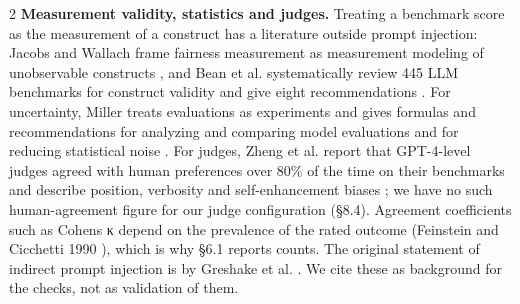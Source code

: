 \documentclass[9pt]{extarticle}
\begin{document}
\begin{multicols}{2}
\textbf{Measurement validity, statistics and judges.} Treating a benchmark score as the measurement of a construct has a literature outside prompt injection: Jacobs and Wallach frame fairness measurement as measurement modeling of unobservable constructs \cite{arxiv1912_05511}, and Bean et al. systematically review 445 LLM benchmarks for construct validity and give eight recommendations \cite{arxiv2511_04703}. For uncertainty, Miller treats evaluations as experiments and gives formulas and recommendations for analyzing and comparing model evaluations and for reducing statistical noise \cite{arxiv2411_00640}. For judges, Zheng et al. report that GPT-4-level judges agreed with human preferences over 80\% of the time on their benchmarks and describe position, verbosity and self-enhancement biases \cite{arxiv2306_05685}; we have no such human-agreement figure for our judge configuration (§8.4). Agreement coefficients such as Cohen\textquotesingle s κ depend on the prevalence of the rated outcome (Feinstein and Cicchetti 1990 \cite{FC1990}), which is why §6.1 reports counts. The original statement of indirect prompt injection is by Greshake et al. \cite{arxiv2302_12173}. We cite these as background for the checks, not as validation of them.


\end{multicols}
\end{document}
